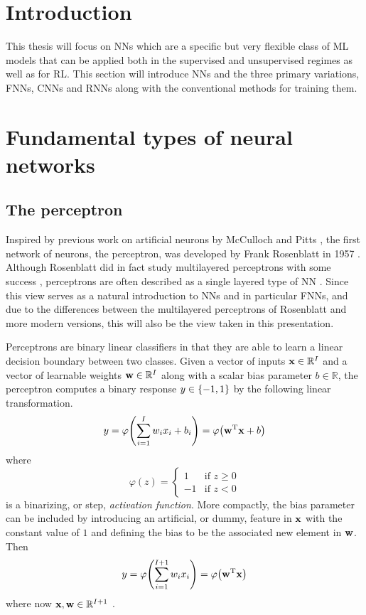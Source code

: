 

\section{Introduction}
This thesis will focus on \glspl{NN} which are a specific but very flexible class of \gls{ML} models that can be applied both in the supervised and unsupervised regimes as well as for \gls{RL}. This section will introduce \glspl{NN} and the three primary variations, \glspl{FNN}, \glspl{CNN} and \glspl{RNN} along with the conventional methods for training them.

\section{Fundamental types of neural networks}
\subsection{The perceptron}
Inspired by previous work on artificial neurons by McCulloch and Pitts \cite{McCulloch1943}, the first network of neurons, the perceptron, was developed by Frank Rosenblatt in 1957 \cite{Rosenblatt1957}.  Although Rosenblatt did in fact study multilayered perceptrons with some success \cite{Rosenblatt1962, Block1962}, perceptrons are often described as a single layered type of \gls{NN} \cite{Bishop2006, Goodfellow2016}. Since this view serves as a natural introduction to \glspl{NN} and in particular \glspl{FNN}, and due to the differences between the multilayered perceptrons of Rosenblatt and more modern versions, this will also be the view taken in this presentation.

Perceptrons are binary linear classifiers in that they are able to learn a linear decision boundary between two classes. Given a vector of inputs ${\mathbf{x}}\in\mathbb{R}^I$ and a vector of learnable weights ${\mathbf{w}}\in\mathbb{R}^I$ along with a scalar bias parameter $b\in\mathbb{R}$, the perceptron computes a binary response $y\in{\left\{-1,1\right\}}$ by the following linear transformation.
\begin{equation}
    y = \varphi{\left(\sum_{i=1}^I w_ix_i + b_i\right)} = \varphi{\left({\mathbf{w}}{^\mathrm{T}}{\mathbf{x}}+ b\right)}
\end{equation}
where 
\begin{equation}
    \varphi(z) = \begin{cases}
                    1 & \text{if } z\geq0\\
                    -1 & \text{if } z<0
                 \end{cases}
\end{equation}
is a binarizing, or step, \textit{activation function}. More compactly, the bias parameter can be included by introducing an artificial, or dummy, feature in ${\mathbf{x}}$ with the constant value of $1$ and defining the bias to be the associated new element in ${\mathbf{w}}$. Then  
\begin{equation}\label{eq: Machine learning: Perceptron forward no bias}
    y = \varphi{\left(\sum_{i=1}^{I+1} w_ix_i\right)} = \varphi{\left({\mathbf{w}}{^\mathrm{T}}{\mathbf{x}}\right)}
\end{equation}
where now ${\mathbf{x}}, {\mathbf{w}}\in\mathbb{R}^{I+1}$ \cite{Bishop2006}.


